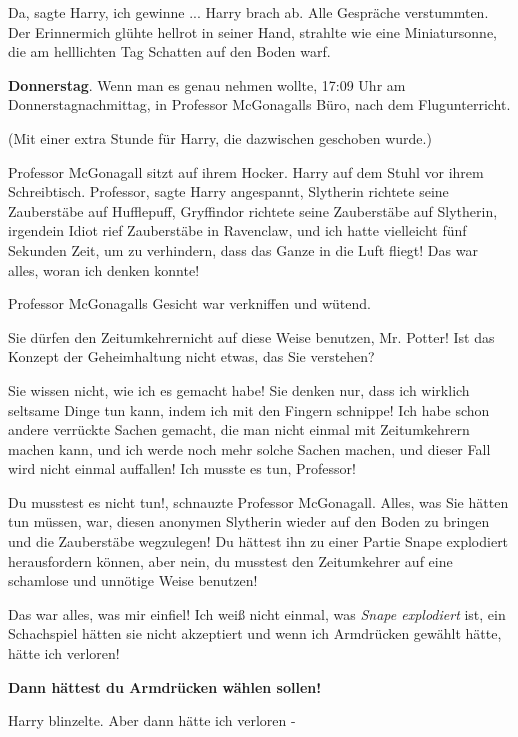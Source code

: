 \glqq{}Da\grqq{}, sagte Harry, \glqq{}ich gewinne ...\grqq{} Harry brach ab. Alle
Gespräche verstummten. Der Erinnermich glühte hellrot in seiner Hand, strahlte
wie eine Miniatursonne, die am helllichten Tag Schatten auf den Boden warf.

\textbf{Donnerstag}. Wenn man es genau nehmen wollte, 17:09 Uhr am
Donnerstagnachmittag, in Professor McGonagalls Büro, nach dem Flugunterricht.

(Mit einer extra Stunde für Harry, die dazwischen geschoben wurde.)

Professor McGonagall sitzt auf ihrem Hocker. Harry auf dem Stuhl vor ihrem
Schreibtisch. \glqq{}Professor\grqq{}, sagte Harry angespannt, \glqq{}Slytherin
richtete seine Zauberstäbe auf Hufflepuff, Gryffindor richtete seine Zauberstäbe
auf Slytherin, irgendein Idiot rief Zauberstäbe in Ravenclaw, und ich hatte
vielleicht fünf Sekunden Zeit, um zu verhindern, dass das Ganze in die Luft
fliegt! Das war alles, woran ich denken konnte!\grqq{}

Professor McGonagalls Gesicht war verkniffen und wütend.

\glqq{}Sie dürfen den Zeitumkehrernicht auf diese Weise benutzen, Mr. Potter! Ist
das Konzept der Geheimhaltung nicht etwas, das Sie verstehen?\grqq{}

\glqq{}Sie wissen nicht, wie ich es gemacht habe! Sie denken nur, dass ich
wirklich seltsame Dinge tun kann, indem ich mit den Fingern schnippe! Ich habe
schon andere verrückte Sachen gemacht, die man nicht einmal mit Zeitumkehrern
machen kann, und ich werde noch mehr solche Sachen machen, und dieser Fall wird
nicht einmal auffallen! Ich musste es tun, Professor!\grqq{}

\glqq{}Du musstest es nicht tun!\grqq{}, schnauzte Professor McGonagall. \glqq{}
Alles, was Sie hätten tun müssen, war, diesen anonymen Slytherin wieder auf den
Boden zu bringen und die Zauberstäbe wegzulegen! Du hättest ihn zu einer Partie
Snape explodiert herausfordern können, aber nein, du musstest den Zeitumkehrer
auf eine schamlose und unnötige Weise benutzen!\grqq{}

\glqq{}Das war alles, was mir einfiel! Ich weiß nicht einmal, was \emph{Snape
explodiert} ist, ein Schachspiel hätten sie nicht akzeptiert und wenn ich
Armdrücken gewählt hätte, hätte ich verloren!\grqq{}

\textbf{\glqq{}Dann hättest du Armdrücken wählen sollen!\grqq{}}

Harry blinzelte. \glqq{}Aber dann hätte ich verloren -\grqq{}

